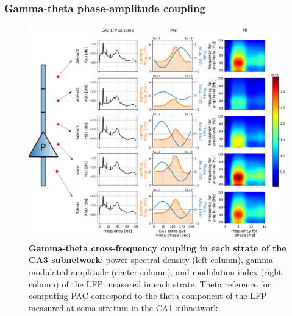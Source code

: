 \documentclass[../main.tex]{subfiles}
\begin{document}
\subsubsection{Gamma-theta phase-amplitude coupling}
\begin{figure}[t]
    \centering
    \includegraphics[width=\textwidth]{chapter4/figures/baseline_CA3_properties.png}
    \caption{\textbf{Gamma-theta cross-frequency coupling in each strate of the CA3 subnetwork}: power spectral density (left column), gamma modulated amplitude (center column), and modulation index (right column) of the LFP measured in each strate.
    Theta reference for computing PAC correspond to the theta component of the LFP measured at soma stratum in the CA1 subnetwork.}
    \label{fig:baseline-CA3-properties}
\end{figure}
\end{document}
